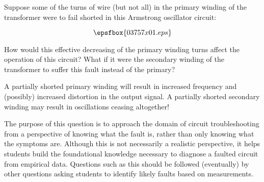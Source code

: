 

Suppose some of the turns of wire (but not all) in the primary winding of the transformer were to fail shorted in this Armstrong oscillator circuit:

$$\epsfbox{03757x01.eps}$$

How would this effective decreasing of the primary winding turns affect the operation of this circuit?  What if it were the secondary winding of the transformer to suffer this fault instead of the primary?







A partially shorted primary winding will result in increased frequency and (possibly) increased distortion in the output signal.  A partially shorted secondary winding may result in oscillations ceasing altogether!







The purpose of this question is to approach the domain of circuit troubleshooting from a perspective of knowing what the fault is, rather than only knowing what the symptoms are.  Although this is not necessarily a realistic perspective, it helps students build the foundational knowledge necessary to diagnose a faulted circuit from empirical data.  Questions such as this should be followed (eventually) by other questions asking students to identify likely faults based on measurements.




